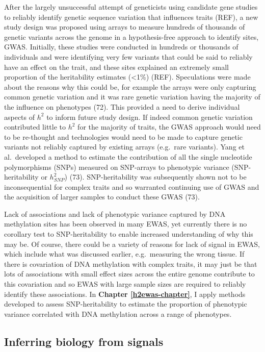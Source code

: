 \documentclass[11pt,twoside]{bristolthesis}
\begin{document}
After the largely unsuccessful attempt of geneticists using candidate gene studies to reliably identify genetic sequence variation that influences traits (REF), a new study design was proposed using arrays to measure hundreds of thousands of genetic variants across the genome in a hypothesis-free approach to identify sites, GWAS. Initially, these studies were conducted in hundreds or thousands of individuals and were identifying very few variants that could be said to reliably have an effect on the trait, and these sites explained an extremely small proportion of the heritability estimates (\textless1\%) (REF). Speculations were made about the reasons why this could be, for example the arrays were only capturing common genetic variation and it was rare genetic variation having the majority of the influence on phenotypes (72). This provided a need to derive individual aspects of \(h^2\) to inform future study design. If indeed common genetic variation contributed little to \(h^2\) for the majority of traits, the GWAS approach would need to be re-thought and technologies would need to be made to capture genetic variants not reliably captured by existing arrays (e.g.~rare variants). Yang et al.~developed a method to estimate the contribution of all the single nucleotide polymorphisms (SNPs) measured on SNP-arrays to phenotypic variance (SNP-heritability or \(h^2_{SNP}\)) (73). SNP-heritability was subsequently shown not to be inconsequential for complex traits and so warranted continuing use of GWAS and the acquisition of larger samples to conduct these GWAS (73).

Lack of associations and lack of phenotypic variance captured by DNA methylation sites has been observed in many EWAS, yet currently there is no corollary test to SNP-heritability to enable increased understanding of why this may be. Of course, there could be a variety of reasons for lack of signal in EWAS, which include what was discussed earlier, e.g.~measuring the wrong tissue. If there is covariation of DNA methylation with complex traits, it may just be that lots of associations with small effect sizes across the entire genome contribute to this covariation and so EWAS with large sample sizes are required to reliably identify these associations. In \textbf{Chapter \ref{h2ewas-chapter}}, I apply methods developed to assess SNP-heritability to estimate the proportion of phenotypic variance correlated with DNA methylation across a range of phenotypes.

\hypertarget{inferring-biology-from-signals}{%
\subsection{Inferring biology from signals}\label{inferring-biology-from-signals}}
\end{document}
